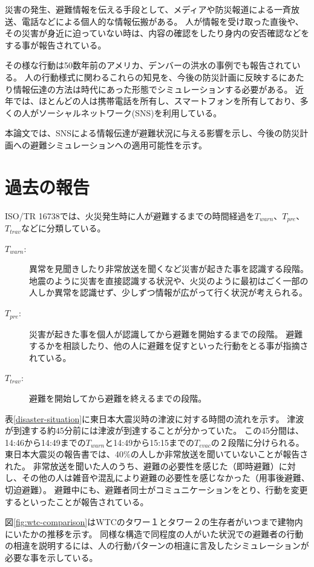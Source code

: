 \documentclass[a4j]{jarticle}
\begin{document}
災害の発生、避難情報を伝える手段として、メディアや防災報道による一斉放送、電話などによる個人的な情報伝搬がある。
人が情報を受け取った直後や、その災害が身近に迫っていない時は、内容の確認をしたり身内の安否確認などをする事が報告されている。

その様な行動は50数年前のアメリカ、デンバーの洪水の事例でも報告されている\cite{drabek}。
人の行動様式に関わるこれらの知見を、今後の防災計画に反映するにあたり情報伝達の方法は時代にあった形態でシミュレーションする必要がある。
近年では、ほとんどの人は携帯電話を所有し、スマートフォンを所有しており、多くの人がソーシャルネットワーク(SNS)を利用している。

本論文では、SNSによる情報伝達が避難状況に与える影響を示し、今後の防災計画への避難シミュレーションへの適用可能性を示す。



\section{過去の報告}\label{sec:related-works}

{ISO/TR 16738}では、火災発生時に人が避難するまでの時間経過を${T}_{warn}$、$T_{pre}$、$T_{trav}$などに分類している。
\begin{description}
\item[$T_{warn}$:]{
  異常を見聞きしたり非常放送を聞くなど災害が起きた事を認識する段階。
  地震のように災害を直接認識する状況や、火災のように最初はごく一部の人しか異常を認識せず、少しずつ情報が広がって行く状況が考えられる。
}
\item[$T_{pre}$:]{
  災害が起きた事を個人が認識してから避難を開始するまでの段階。
  避難するかを相談したり、他の人に避難を促すといった行動をとる事が指摘されている。
}
\item[$T_{trav}$:]{
  避難を開始してから避難を終えるまでの段階。
}
\end{description}

表\ref{disaster-situation}に東日本大震災時の津波に対する時間の流れを示す。
津波が到達する約45分前には津波が到達することが分かっていた。
この45分間は、14:46から14:49までの$T_{warn}$と14:49から15:15までの$T_{evac}$の２段階に分けられる。
東日本大震災の報告書では、40\%の人しか非常放送を聞いていないことが報告された。
非常放送を聞いた人のうち、避難の必要性を感じた（即時避難）に対し、その他の人は雑音や混乱により避難の必要性を感じなかった（用事後避難、切迫避難）。
避難中にも、避難者同士がコミュニケーションをとり、行動を変更するといったことが報告されている\cite{muramoto:2012}。

図\ref{fig:wtc-comparison}はWTCのタワー１とタワー２の生存者がいつまで建物内にいたかの推移を示す。
同様な構造で同程度の人がいた状況での避難者の行動の相違を説明するには、人の行動パターンの相違に言及したシミュレーションが必要な事を示している。
\end{document}
